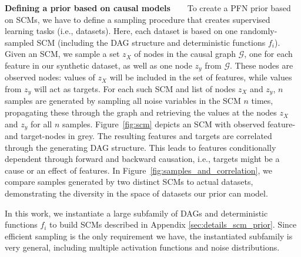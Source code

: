\documentclass{article}
\newcommand{\slimparagraph}[1]{\textbf{#1~~~}}
\begin{document}
\slimparagraph{Defining a prior based on causal models}
To create a PFN prior based on SCMs, we have to define a sampling procedure that creates supervised learning tasks (i.e., datasets).
Here, each dataset is based on one randomly-sampled SCM (including the DAG structure and deterministic functions $f_i$).
Given an SCM, we sample a set $z_X$ of nodes in the causal graph $\mathcal{G}$, one for each feature in our synthetic dataset, as well as one node $z_y$ from $\mathcal{G}$.
These nodes are observed nodes: values of $z_X$ will be included in the set of features, while values from $z_y$ will act as targets.
For each such SCM and list of nodes $z_X$ and $z_y$, $n$ samples are generated by sampling all noise variables in the SCM $n$ times, propagating these through the graph and retrieving the values at the nodes $z_X$ and $z_y$ for all $n$ samples.
Figure~\ref{fig:scm} depicts an SCM with observed feature- and target-nodes in grey.
The resulting features and targets are correlated through the generating DAG structure.
This leads to features conditionally dependent through forward and backward causation, i.e., targets might be a cause or an effect of features.
In Figure~\ref{fig:samples_and_correlation}, we compare samples generated by two distinct SCMs to actual datasets, demonstrating the diversity in the space of datasets our prior can model. 

In this work, we instantiate a large subfamily of DAGs and deterministic functions $f_i$ to build SCMs described in Appendix \ref{sec:details_scm_prior}.
Since efficient sampling is the only requirement we have, the instantiated subfamily is very general, including multiple activation functions and noise distributions.
\end{document}
